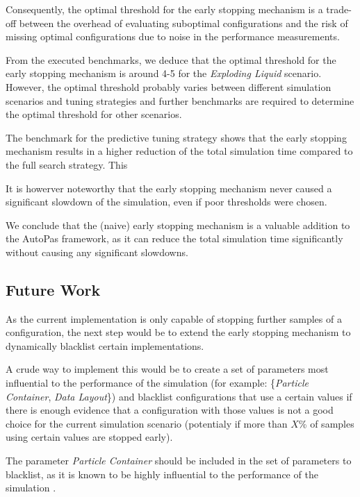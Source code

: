 \documentclass[conference]{IEEEtran}
\begin{document}
Consequently, the optimal threshold for the early stopping mechanism is a trade-off between the overhead of evaluating suboptimal configurations and the risk of missing optimal configurations due to noise in the performance measurements.

From the executed benchmarks, we deduce that the optimal threshold for the early stopping mechanism is around 4-5 for the \textit{Exploding Liquid} scenario. However, the optimal threshold probably varies between different simulation scenarios and tuning strategies and further benchmarks are required to determine the optimal threshold for other scenarios.

The benchmark for the predictive tuning strategy shows that the early stopping mechanism results in a higher reduction of the total simulation time compared to the full search strategy. This

It is howerver noteworthy that the early stopping mechanism never caused a significant slowdown of the simulation, even if poor thresholds were chosen.

We conclude that the (naive) early stopping mechanism is a valuable addition to the AutoPas framework, as it can reduce the total simulation time significantly without causing any significant slowdowns.

\subsection{Future Work}

As the current implementation is only capable of stopping further samples of a configuration, the next step would be to extend the early stopping mechanism to dynamically blacklist certain implementations.

A crude way to implement this would be to create a set of parameters most influential to the performance of the simulation (for example: \{\textit{Particle Container}, \textit{Data Layout}\}) and blacklist configurations that use a certain values if there is enough evidence that a configuration with those values is not a good choice for the current simulation scenario (potentialy if more than $X$\% of samples using certain values are stopped early).

The parameter \textit{Particle Container} should be included in the set of parameters to blacklist, as it is known to be highly influential to the performance of the simulation \cite{Gratl2019AutoPas}.


\newpage
\newpage
\end{document}
